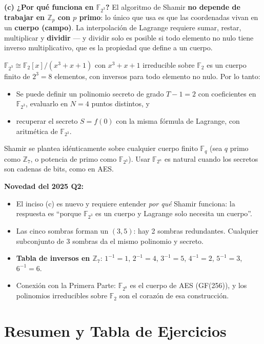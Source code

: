\documentclass[11pt,a4paper]{article}
\begin{document}
\medskip
\textbf{(c) ¿Por qué funciona en $\mathbb{F}_{2^3}$?}
El algoritmo de Shamir \textbf{no depende de trabajar en $\mathbb{Z}_p$ con $p$ primo}: lo único que usa es que las coordenadas vivan en un \textbf{cuerpo (campo)}. La interpolación de Lagrange requiere sumar, restar, multiplicar y \textbf{dividir} --- y dividir solo es posible si todo elemento no nulo tiene inverso multiplicativo, que es la propiedad que define a un cuerpo.

$\mathbb{F}_{2^3}\cong\mathbb{F}_2[x]/(x^3+x+1)$ con $x^3+x+1$ irreducible sobre $\mathbb{F}_2$ es un cuerpo finito de $2^3=8$ elementos, con inversos para todo elemento no nulo. Por lo tanto:
\begin{itemize}
  \item Se puede definir un polinomio secreto de grado $T-1=2$ con coeficientes en $\mathbb{F}_{2^3}$, evaluarlo en $N=4$ puntos distintos, y
  \item recuperar el secreto $S=f(0)$ con la misma fórmula de Lagrange, con aritmética de $\mathbb{F}_{2^3}$.
\end{itemize}
Shamir se plantea idénticamente sobre cualquier cuerpo finito $\mathbb{F}_q$ (sea $q$ primo como $\mathbb{Z}_7$, o potencia de primo como $\mathbb{F}_{2^3}$). Usar $\mathbb{F}_{2^n}$ es natural cuando los secretos son cadenas de bits, como en AES.

\begin{tipsbox}
\textbf{Novedad del 2025 Q2:}
\begin{itemize}
  \item El inciso (c) es nuevo y requiere entender \emph{por qué} Shamir funciona: la respuesta es ``porque $\mathbb{F}_{2^3}$ es un cuerpo y Lagrange solo necesita un cuerpo''.
  \item Las cinco sombras forman un $(3,5)$: hay 2 sombras redundantes. Cualquier subconjunto de 3 sombras da el mismo polinomio y secreto.
  \item \textbf{Tabla de inversos en $\mathbb{Z}_7$}: $1^{-1}=1$, $2^{-1}=4$, $3^{-1}=5$, $4^{-1}=2$, $5^{-1}=3$, $6^{-1}=6$.
  \item Conexión con la Primera Parte: $\mathbb{F}_{2^8}$ es el cuerpo de AES (GF(256)), y los polinomios irreducibles sobre $\mathbb{F}_2$ son el corazón de esa construcción.
\end{itemize}
\end{tipsbox}

\section{Resumen y Tabla de Ejercicios}
\end{document}
